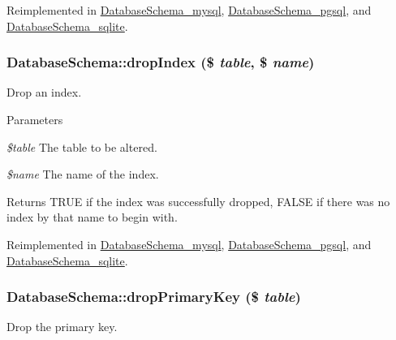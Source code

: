 Reimplemented in \hyperlink{classDatabaseSchema__mysql_a87bb4ca35f69061ca489d45d4f74b3c7}{DatabaseSchema\_\-mysql}, \hyperlink{classDatabaseSchema__pgsql_a08e3aef1903dc40b2f0c75d4f18507bf}{DatabaseSchema\_\-pgsql}, and \hyperlink{classDatabaseSchema__sqlite_a724d96040dfa30f34e5f0278525774bf}{DatabaseSchema\_\-sqlite}.\hypertarget{classDatabaseSchema_adf5467aa59e462857527d8f1a5988a81}{
\subsubsection[{dropIndex}]{\setlength{\rightskip}{0pt plus 5cm}DatabaseSchema::dropIndex (\$ {\em table}, \/  \$ {\em name})}}
\label{classDatabaseSchema_adf5467aa59e462857527d8f1a5988a81}
Drop an index.


\begin{DoxyParams}{Parameters}
\item[{\em \$table}]The table to be altered. \item[{\em \$name}]The name of the index.\end{DoxyParams}
\begin{DoxyReturn}{Returns}
TRUE if the index was successfully dropped, FALSE if there was no index by that name to begin with. 
\end{DoxyReturn}


Reimplemented in \hyperlink{classDatabaseSchema__mysql_a2bd472fc5238f3b5d53284768475881c}{DatabaseSchema\_\-mysql}, \hyperlink{classDatabaseSchema__pgsql_a6c04b76c95ca7f68995baae8b0fe5b08}{DatabaseSchema\_\-pgsql}, and \hyperlink{classDatabaseSchema__sqlite_a876b9d643b03532cf0be81f6ea13ad9f}{DatabaseSchema\_\-sqlite}.\hypertarget{classDatabaseSchema_a08057609758a32c13c4d1863da54b63e}{
\subsubsection[{dropPrimaryKey}]{\setlength{\rightskip}{0pt plus 5cm}DatabaseSchema::dropPrimaryKey (\$ {\em table})}}
\label{classDatabaseSchema_a08057609758a32c13c4d1863da54b63e}
Drop the primary key.


